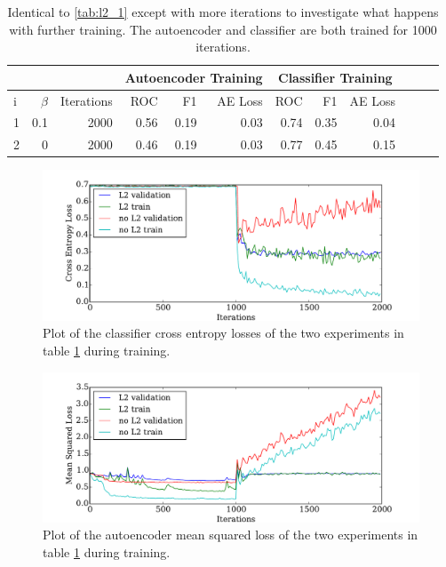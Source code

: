         \begin{table}[!h]
          {\footnotesize \centering
          \begin{tabular}{lrrrrrrrrrrr}
            &&&   \multicolumn{3}{|c|}{Autoencoder Training} &  \multicolumn{3}{c|}{Classifier Training}    \\
          \hline
           i &   $\beta$ &   Iterations &   ROC&F1&AE Loss & ROC & F1 & AE Loss \\
          \hline
           1 &       0.1 & 2000 &    0.56 &   0.19 &     0.03 &    0.74 &   0.35 &     0.04\\
           2 &       0   & 2000 &    0.46 &   0.19 &     0.03 &    0.77 &   0.45 &     0.15\\
          \hline
        \end{tabular}
        \caption{Identical to \ref{tab:l2_1} except with more iterations to investigate what happens with further training.
        The autoencoder and classifier are both trained for 1000 iterations.}
        \label{tab:l2_2} }
        \end{table}

        \begin{figure}[!h]
          \centering
            \includegraphics[width =0.8\hsize]{figures/l2.pdf}
              \caption{Plot of the classifier cross entropy losses of the two experiments in table \ref{tab:l2_2} during training.}
          \label{fig:l2_1}
        \end{figure}

        \begin{figure}[!h]
          \centering
            \includegraphics[width =0.8\hsize]{figures/l2_auto.pdf}
              \caption{Plot of the autoencoder mean squared loss of the two experiments in table \ref{tab:l2_2} during training.}
          \label{fig:l2_2}
        \end{figure}

